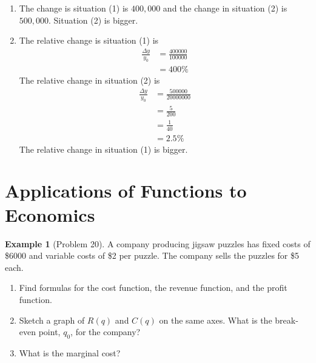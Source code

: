 \documentclass[oneside]{book}
\theoremstyle{definition}
\newtheorem{example}{Example}
\theoremstyle{solution}
\newtheorem*{solution}{Solution}
\newenvironment{solution}{\vspace{2in}\comment}{\endcomment}
\begin{document}
\begin{solution}
  \begin{enumerate}
  \item 
The change is situation (1) is $400,000$ and the change in situation
(2) is $500,000$.  Situation (2) is bigger.

\item 
The relative change is situation (1) is 
\begin{align*}
\frac{\Delta y }{y_0} & = \frac{400000}{100000}\\
 & = 400\%
\end{align*}
The relative change in situation (2) is 
\begin{align*}
\frac{\Delta y }{y_0} & = \frac{500000}{20000000}\\
 & = \frac{5}{200} \\
 & = \frac{1}{40}\\
& = 2.5\%
\end{align*}
The relative change in situation (1) is bigger.
\end{enumerate}
\end{solution}


\section{Applications of Functions to Economics}

\begin{example}[Problem 20]
A company producing jigsaw puzzles has fixed costs of \$6000 and
variable costs of \$2 per puzzle. The company sells the puzzles for \$5
each. 
\begin{enumerate}
\item  
Find formulas for the cost function, the revenue function, and the profit function.

\item Sketch a graph of $R(q)$  and $C(q)$ on the same
  axes. What is the break-even point, $q_0$, for the company?

\item What is the marginal cost?
\end{enumerate}
\end{example}
\end{document}
